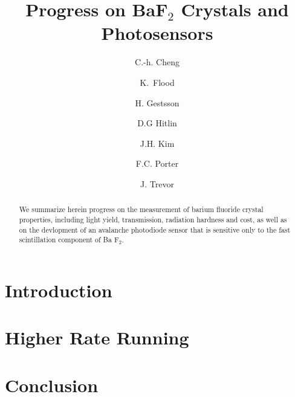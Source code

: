 \documentclass[5p,twocolumn,times,number]{elsarticle}
\begin{document}
\begin{frontmatter}

\title{Progress on BaF$_2$ Crystals and Photosensors}

\author{C.-h. Cheng}
\author{K.~Flood}
\author{H. Gestsson}
\author{D.G Hitlin}
\author{J.H. Kim}
\author{F.C. Porter}
\author{J. Trevor}



\address{Caltech}


\begin{abstract}
We summarize herein progress on the measurement of barium fluoride crystal properties, including light yield, transmission, radiation hardness and cost, as well as on the devlopment of an avalanche photodiode sensor that is sensitive only to the fast scintillation component of Ba F$_2$.

\end{abstract}


\end{frontmatter}



\section{Introduction}


\section{Higher Rate Running}


\section{Conclusion}



\end{document}

